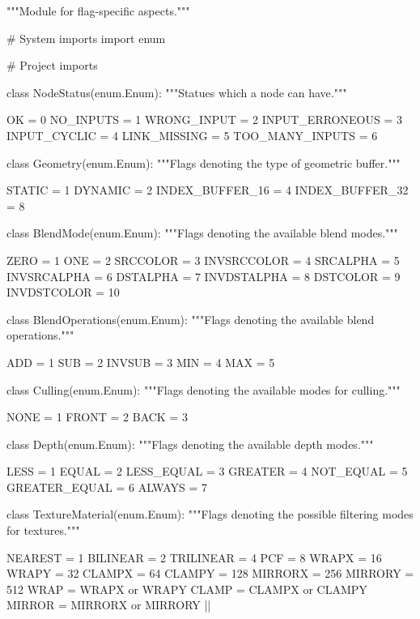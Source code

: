 \documentclass[%
    a4paper,    %
    justified,  %
    nobib,      %
    openany     %
]{tufte-book}
\begin{document}
\begin{fullwidth}
\begin{flushleft}
\begin{minipage}{\linewidth}
\begin{pythoncode}
"""Module for flag-specific aspects."""

# System imports
import enum

# Project imports


class NodeStatus(enum.Enum):
    """Statues which a node can have."""

    OK              = 0
    NO_INPUTS       = 1
    WRONG_INPUT     = 2
    INPUT_ERRONEOUS = 3
    INPUT_CYCLIC    = 4
    LINK_MISSING    = 5
    TOO_MANY_INPUTS = 6


class Geometry(enum.Enum):
    """Flags denoting the type of geometric buffer."""

    STATIC          = 1
    DYNAMIC         = 2
    INDEX_BUFFER_16 = 4
    INDEX_BUFFER_32 = 8


class BlendMode(enum.Enum):
    """Flags denoting the available blend modes."""

    ZERO        = 1
    ONE         = 2
    SRCCOLOR    = 3
    INVSRCCOLOR = 4
    SRCALPHA    = 5
    INVSRCALPHA = 6
    DSTALPHA    = 7
    INVDSTALPHA = 8
    DSTCOLOR    = 9
    INVDSTCOLOR = 10


class BlendOperations(enum.Enum):
    """Flags denoting the available blend operations."""
    
    ADD    = 1
    SUB    = 2
    INVSUB = 3
    MIN    = 4
    MAX    = 5


class Culling(enum.Enum):
    """Flags denoting the available modes for culling."""

    NONE  = 1
    FRONT = 2
    BACK  = 3

class Depth(enum.Enum):
    """Flags denoting the available depth modes."""

    LESS          = 1
    EQUAL         = 2
    LESS_EQUAL    = 3
    GREATER       = 4
    NOT_EQUAL     = 5
    GREATER_EQUAL = 6
    ALWAYS        = 7


class TextureMaterial(enum.Enum):
    """Flags denoting the possible filtering modes for textures."""

    NEAREST   = 1
    BILINEAR  = 2
    TRILINEAR = 4
    PCF       = 8
    WRAPX     = 16
    WRAPY     = 32
    CLAMPX    = 64
    CLAMPY    = 128
    MIRRORX   = 256
    MIRRORY   = 512
    WRAP      = WRAPX   or WRAPY
    CLAMP     = CLAMPX  or CLAMPY
    MIRROR    = MIRRORX or MIRRORY
|\NWsep|
\end{pythoncode}
\vspace{1.5ex}
\footnotesize
\begin{list}{}{\setlength{\itemsep}{-\parsep}\setlength{\itemindent}{-\leftmargin}}


\end{list}
\end{minipage}
\end{flushleft}
\end{fullwidth}
\end{document}
